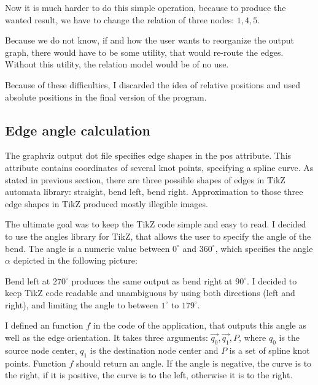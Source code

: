 \documentclass{ctuthesis}
\begin{document}
Now it is much harder to do this simple operation, because to produce the wanted result, we have to change the relation of three nodes: $1, 4, 5$. 

Because we do not know, if and how the user wants to reorganize the output graph, there would have to be some utility, that would re-route the edges. Without this utility, the relation model would be of no use.

Because of these difficulties, I discarded the idea of relative positions and used absolute positions in the final version of the program.

\subsection{Edge angle calculation}
\label{subsec:edge-angle}
The graphviz output dot file specifies edge shapes in the pos attribute. This attribute contains coordinates of several knot points, specifying a spline curve. As stated in previous section, there are three possible shapes of edges in TikZ automata library: straight, bend left, bend right. Approximation to those three edge shapes in TikZ produced mostly illegible images. 

The ultimate goal was to keep the TikZ code simple and easy to read. I decided to use the angles library for TikZ, that allows the user to specify the angle of the bend. The angle is a numeric value between $0^\circ$ and $360^\circ$, which specifies the angle $\alpha$ depicted in the following picture:

\begin{figure}[H]
\end{figure}

Bend left at $270^\circ$ produces the same output as bend right at $90^\circ$. I decided to keep TikZ code readable and unambiguous by using both directions (left and right), and limiting the angle to between $1^\circ$ to $179^\circ$.

I defined an function $f$ in the code of the application, that outputs this angle as well as the edge orientation. It takes three arguments: $\vec{q_0}, \vec{q_1}, P$, where $q_0$ is the source node center, $q_1$ is the destination node center and $P$ is a set of spline knot points. Function $f$ should return an angle. If the angle is negative, the curve is to the right, if it is positive, the curve is to the left, otherwise it is to the right. 
\end{document}
